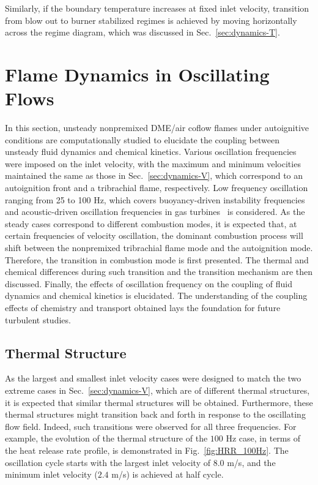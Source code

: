 Similarly, if the boundary temperature increases at fixed inlet velocity, transition from blow out to burner stabilized regimes is achieved by moving horizontally across the regime diagram, which was discussed in Sec.~\ref{sec:dynamics-T}.     


\section{Flame Dynamics in Oscillating Flows}

In this section, unsteady nonpremixed DME/air coflow flames under autoignitive conditions are computationally studied to elucidate the coupling between unsteady fluid dynamics and chemical kinetics.  Various oscillation frequencies were imposed on the inlet velocity, with the maximum and minimum velocities maintained the same as those in Sec.~\ref{sec:dynamics-V}, which correspond to an autoignition front and a tribrachial flame, respectively.  Low frequency oscillation ranging from 25 to 100 Hz, which covers buoyancy-driven instability frequencies~\cite{mohammed98,dworkin07} and acoustic-driven oscillation frequencies in gas turbines~\cite{temme12} is considered.  As the steady cases correspond to different combustion modes, it is expected that, at certain frequencies of velocity oscillation, the dominant combustion process will shift between the nonpremixed tribrachial flame mode and the autoignition mode.  Therefore, the transition in combustion mode is first presented.  The thermal and chemical differences during such transition and the transition mechanism are then discussed.  Finally, the effects of oscillation frequency on the coupling of fluid dynamics and chemical kinetics is elucidated.  The understanding of the coupling effects of chemistry and transport obtained lays the foundation for future turbulent studies.

\subsection{Thermal Structure}

As the largest and smallest inlet velocity cases were designed to match the two extreme cases in Sec.~\ref{sec:dynamics-V}, which are of different thermal structures, it is expected that similar thermal structures will be obtained.  Furthermore, these thermal structures might transition back and forth in response to the oscillating flow field.  Indeed, such transitions were observed for all three frequencies.  For example, the evolution of the thermal structure of the $100$ Hz case, in terms of the heat release rate profile, is demonstrated in Fig.~\ref{fig:HRR_100Hz}.  The oscillation cycle starts with the largest inlet velocity of $8.0$ m/s, and the minimum inlet velocity ($2.4$ m/s) is achieved at half cycle.  

